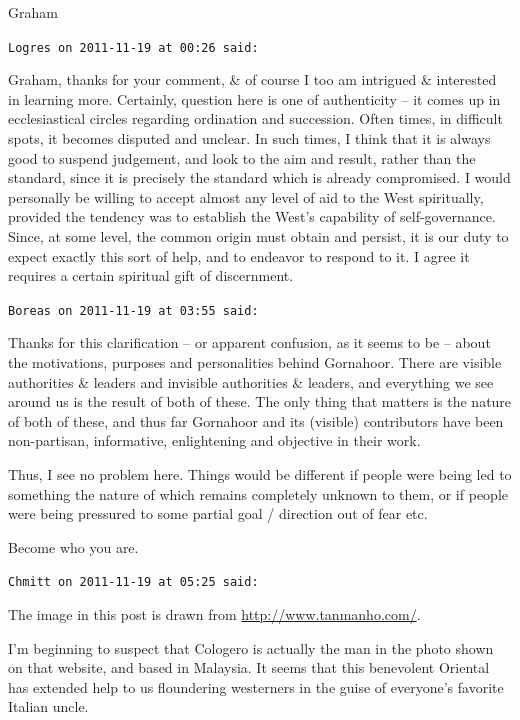 \begin{footnotesize}
\begin{sffamily}
Graham


\hfill

\texttt{Logres on 2011-11-19 at 00:26 said: }

Graham, thanks for your comment, \& of course I too am intrigued \& interested in learning more. Certainly, question here is one of authenticity – it comes up in ecclesiastical circles regarding ordination and succession. Often times, in difficult spots, it becomes disputed and unclear. In such times, I think that it is always good to suspend judgement, and look to the aim and result, rather than the standard, since it is precisely the standard which is already compromised. I would personally be willing to accept almost any level of aid to the West spiritually, provided the tendency was to establish the West's capability of self-governance. Since, at some level, the common origin must obtain and persist, it is our duty to expect exactly this sort of help, and to endeavor to respond to it. I agree it requires a certain spiritual gift of discernment.


\hfill

\texttt{Boreas on 2011-11-19 at 03:55 said: }

Thanks for this clarification – or apparent confusion, as it seems to be – about the motivations, purposes and personalities behind Gornahoor. There are visible authorities \& leaders and invisible authorities \& leaders, and everything we see around us is the result of both of these. The only thing that matters is the nature of both of these, and thus far Gornahoor and its (visible) contributors have been non-partisan, informative, enlightening and objective in their work.

Thus, I see no problem here. Things would be different if people were being led to something the nature of which remains completely unknown to them, or if people were being pressured to some partial goal / direction out of fear etc.

Become who you are.


\hfill

\texttt{Chmitt on 2011-11-19 at 05:25 said: }

The image in this post is drawn from \url{http://www.tanmanho.com/}.

I'm beginning to suspect that Cologero is actually the man in the photo shown on that website, and based in Malaysia. It seems that this benevolent Oriental has extended help to us floundering westerners in the guise of everyone's favorite Italian uncle.


\end{sffamily}
\end{footnotesize}
